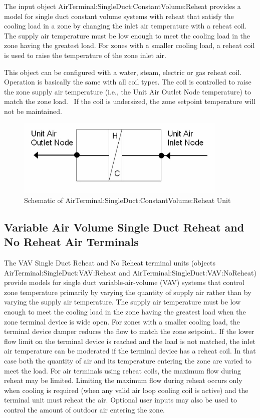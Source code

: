 The input object AirTerminal:SingleDuct:ConstantVolume:Reheat provides a model for single duct constant volume systems with reheat that satisfy the cooling load in a zone by changing the inlet air temperature with a reheat coil. The supply air temperature must be low enough to meet the cooling load in the zone having the greatest load. For zones with a smaller cooling load, a reheat coil is used to raise the temperature of the zone inlet air.

This object can be configured with a water, steam, electric or gas reheat coil. Operation is basically the same with all coil types. The coil is controlled to raise the zone supply air temperature (i.e., the Unit Air Outlet Node temperature) to match the zone load.~ If the coil is undersized, the zone setpoint temperature will not be maintained.

\begin{figure}[hbtp] %
\centering
\includegraphics[width=0.9\textwidth, height=0.9\textheight, keepaspectratio=true]{media/image2788.png}
\caption{Schematic of AirTerminal:SingleDuct:ConstantVolume:Reheat Unit \protect \label{fig:schematic-of-airterminal-singleduct}}
\end{figure}

\subsection{Variable Air Volume Single Duct Reheat and No Reheat Air Terminals}\label{variable-air-volume-single-duct-reheat-and-no-reheat-air-terminals}

The VAV Single Duct Reheat and No Reheat terminal units (objects AirTerminal:SingleDuct:VAV:Reheat and AirTerminal:SingleDuct:VAV:NoReheat) provide models for single duct variable-air-volume (VAV) systems that control zone temperature primarily by varying the quantity of supply air rather than by varying the supply air temperature. The supply air temperature must be low enough to meet the cooling load in the zone having the greatest load when the zone terminal device is wide open. For zones with a smaller cooling load, the terminal device damper reduces the flow to match the zone setpoint.. If the lower flow limit on the terminal device is reached and the load is not matched, the inlet air temperature can be moderated if the terminal device has a reheat coil. In that case both the quantity of air and its temperature entering the zone are varied to meet the load. For air terminals using reheat coils, the maximum flow during reheat may be limited. Limiting the maximum flow during reheat occurs only when cooling is required (when any valid air loop cooling coil is active) and the terminal unit must reheat the air. Optional user inputs may also be used to control the amount of outdoor air entering the zone.

